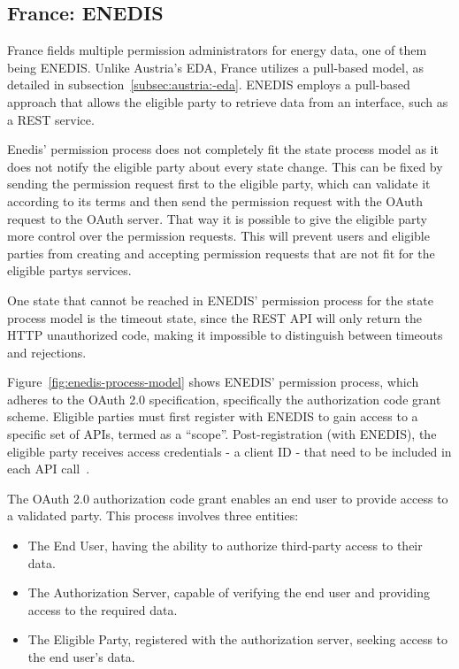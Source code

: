 \subsection{France: ENEDIS}\label{subsec:france:-enedis}
France fields multiple permission administrators for energy data, one of them being ENEDIS.
Unlike Austria's EDA, France utilizes a pull-based model, as detailed in subsection\ \ref{subsec:austria:-eda}.
ENEDIS employs a pull-based approach that allows the eligible party to retrieve data from an interface,
such as a REST service.

Enedis' permission process does not completely fit the state process model as it does not notify the eligible party about every state change.
This can be fixed by sending the permission request first to the eligible party, which can validate it according to its terms and then send the permission request with the OAuth request to the OAuth server.
That way it is possible to give the eligible party more control over the permission requests.
This will prevent users and eligible parties from creating and accepting permission requests that are not fit for the eligible partys services.

One state that cannot be reached in ENEDIS' permission process for the state process model is the timeout state,
since the REST API will only return the HTTP unauthorized code,
making it impossible to distinguish between timeouts and rejections.

Figure\ \ref{fig:enedis-process-model} shows ENEDIS' permission process,
which adheres to the OAuth 2.0 specification, specifically the authorization code grant scheme.
Eligible parties must first register with ENEDIS to gain access to a specific set of APIs, termed as a ``scope''.
Post-registration (with ENEDIS), the eligible party receives access credentials - a client ID -
that need to be included in each API call~\cite{rfc6749-oauth, enedis-dev-guide}.

The OAuth 2.0 authorization code grant enables an end user to provide access to a validated party.
This process involves three entities:
\begin{itemize}
    \item{The End User}, having the ability to authorize third-party access to their data.
    \item{The Authorization Server}, capable of verifying the end user and providing access to the required data.
    \item{The Eligible Party}, registered with the authorization server, seeking access to the end user's data.
\end{itemize}

